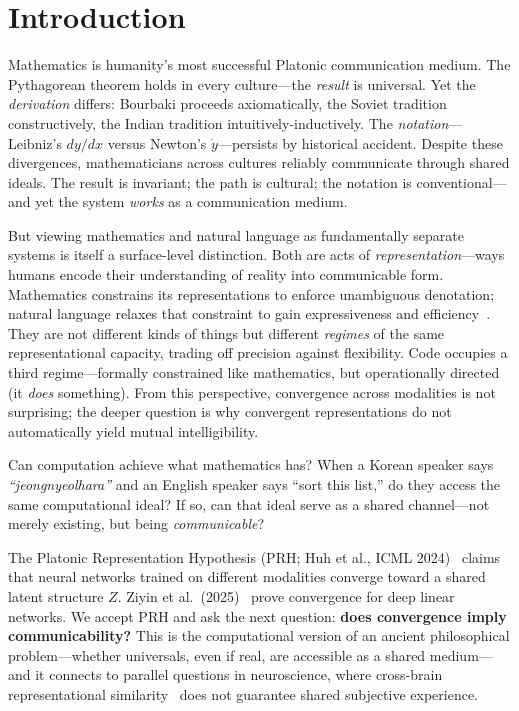\documentclass[11pt]{article}
\theoremstyle{definition}
\begin{document}

\section{Introduction}

Mathematics is humanity's most successful Platonic communication medium. The Pythagorean theorem holds in every culture---the \emph{result} is universal. Yet the \emph{derivation} differs: Bourbaki proceeds axiomatically, the Soviet tradition constructively, the Indian tradition intuitively-inductively. The \emph{notation}---Leibniz's $dy/dx$ versus Newton's $\dot{y}$---persists by historical accident. Despite these divergences, mathematicians across cultures reliably communicate through shared ideals. The result is invariant; the path is cultural; the notation is conventional---and yet the system \emph{works} as a communication medium.

But viewing mathematics and natural language as fundamentally separate systems is itself a surface-level distinction. Both are acts of \emph{representation}---ways humans encode their understanding of reality into communicable form. Mathematics constrains its representations to enforce unambiguous denotation; natural language relaxes that constraint to gain expressiveness and efficiency~\cite{piantadosi2012ambiguity}. They are not different kinds of things but different \emph{regimes} of the same representational capacity, trading off precision against flexibility. Code occupies a third regime---formally constrained like mathematics, but operationally directed (it \emph{does} something). From this perspective, convergence across modalities is not surprising; the deeper question is why convergent representations do not automatically yield mutual intelligibility.

Can computation achieve what mathematics has? When a Korean speaker says \emph{``jeongnyeolhara''} and an English speaker says ``sort this list,'' do they access the same computational ideal? If so, can that ideal serve as a shared channel---not merely existing, but being \emph{communicable}?

The Platonic Representation Hypothesis (PRH; Huh et al., ICML 2024)~\cite{huh2024platonic} claims that neural networks trained on different modalities converge toward a shared latent structure $Z$. Ziyin et al.\ (2025)~\cite{ziyin2025proof} prove convergence for deep linear networks. We accept PRH and ask the next question: \textbf{does convergence imply communicability?} This is the computational version of an ancient philosophical problem---whether universals, even if real, are accessible as a shared medium---and it connects to parallel questions in neuroscience, where cross-brain representational similarity~\cite{haxby2011hyperalignment} does not guarantee shared subjective experience.
\end{document}
